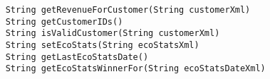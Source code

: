 \begin{verbatim}
    String getRevenueForCustomer(String customerXml)
    String getCustomerIDs()
    String isValidCustomer(String customerXml)
    String setEcoStats(String ecoStatsXml)
    String getLastEcoStatsDate()
    String getEcoStatsWinnerFor(String ecoStatsDateXml)
\end{verbatim}